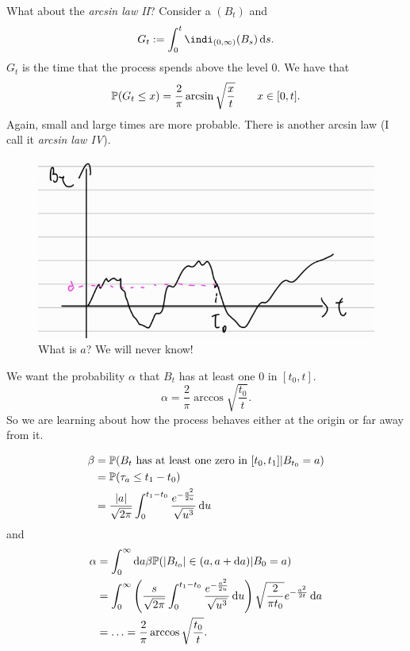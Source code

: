 \documentclass[12pt]{report}
\begin{document}
What about the \emph{arcsin law II}? Consider a \bwm{} $(B_{t})$ and
\begin{equation*}
	G_{t}:=\int_{0}^{t}\indi_{(0,\infty)}(B_{s})\ds.
\end{equation*}
$G_{t}$ is the time that the process spends above the level 0. We have that 
\begin{equation*}
	\mathbb{P}(G_{t}\leq x)=\frac{2}{\pi}\arcsin\sqrt{\frac{x}{t}}\qquad x\in[0,t].
\end{equation*}
Again, small and large times are more probable. There is another arcsin law (I call it \emph{arcsin law IV}).
\begin{figure}[h]
	\centering
	\includegraphics[width=0.5\linewidth]{img/screenshot035}
	\caption{What is $a$? We will never know!}
	\label{fig:screenshot035}
\end{figure}
We want the probability $\alpha$ that $B_{t}$ has at least one $0$ in $[t_{0},t]$.
\begin{equation*}
	\alpha=\frac{2}{\pi}\arccos\sqrt{\frac{t_{0}}{t}}.
\end{equation*}
So we are learning about how the process behaves either at the origin or far away from it.
\begin{fancyproof}                                                                      
	\begin{align*}                                                                         
		\beta&=\mathbb{P}(\text{$B_{t}$ has at least one zero in }[t_{0}, t_{1}]|B_{t_{0}}=a)\\      
		&=\mathbb{P}(\tau_{a}\leq t_{1}-t_{0})\\                                                     
		&=\frac{|a|}{\sqrt{2\pi}}\int_{0}^{t_{1}-t_{0}}\frac{e^{-\frac{a^{2}}{2u}}}{\sqrt{u^{3}}}\mathop{}\!\mathrm{d} u
	\end{align*}                                                                           
	and                                                                                    
	\begin{align*}                           
		\alpha&=\int_{0}^{\infty}\mathop{}\!\mathrm{d} a\beta\mathbb{P}(|B_{t_{0}}|\in(a,a+\mathop{}\!\mathrm{d} a)|B_{0}=a)\\         
		&=\int_{0}^{\infty}\left(\frac{s}{\sqrt{2\pi}}\int_{0}^{t_{1}-t_{0}}\frac{e^{-\frac{a^{2}}{2u}}}{\sqrt{u^{3}}}\mathop{}\!\mathrm{d} u\right)\sqrt{\frac{2}{\pi t_{0}}}e^{-\frac{a^{2}}{2t}}\mathop{}\!\mathrm{d} a\\
		&=\ldots=\frac{2}{\pi}\arccos\sqrt{\frac{t_{0}}{t}}.
	\end{align*}
\end{fancyproof}
\end{document}
